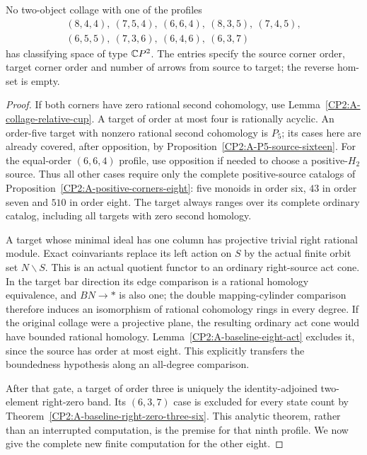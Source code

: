 \begin{proposition}
\label{CP2:A-triangular-sixteen-finite-profiles}
No two-object collage with one of the profiles
\[
\begin{gathered}
(8,4,4),\ (7,5,4),\ (6,6,4),\ (8,3,5),\ (7,4,5),\\
(6,5,5),\ (7,3,6),\ (6,4,6),\ (6,3,7)
\end{gathered}
\]
has classifying space of type $\mathbb{C}P^2$. The entries specify
the source corner order, target corner order and number of
arrows from source to target; the reverse hom-set is empty.
\end{proposition}
\begin{proof}
If both corners have zero rational second cohomology, use
Lemma~\ref{CP2:A-collage-relative-cup}. A target of order at
most four is rationally acyclic. An order-five target with
nonzero rational second cohomology is $P_5$; its cases here
are already covered, after opposition, by
Proposition~\ref{CP2:A-P5-source-sixteen}.
For the equal-order $(6,6,4)$ profile, use opposition if needed
to choose a positive-$H_2$ source. Thus all other cases require
only the complete positive-source catalogs of
Proposition~\ref{CP2:A-positive-corners-eight}: five monoids
in order six, $43$ in order seven and $510$ in order eight.
The target always ranges over its complete ordinary catalog,
including all targets with zero second homology.

A target whose minimal ideal has one column has projective
trivial right rational module. Exact coinvariants replace its
left action on $S$ by the actual finite orbit set $N\backslash S$.
This is an actual quotient functor to an ordinary right-source
act cone. In the target bar direction its edge comparison is
a rational homology equivalence, and $BN\to *$ is also one;
the double mapping-cylinder comparison therefore induces an
isomorphism of rational cohomology rings in every degree.
If the original collage were a projective plane, the resulting
ordinary act cone would have bounded rational homology.
Lemma~\ref{CP2:A-baseline-eight-act} excludes it, since the
source has order at most eight. This explicitly transfers the
boundedness hypothesis along an all-degree comparison.

After that gate, a target of order three is uniquely the
identity-adjoined two-element right-zero band. Its $(6,3,7)$
case is excluded for every state count by
Theorem~\ref{CP2:A-baseline-right-zero-three-six}.
This analytic theorem, rather than an interrupted computation,
is the premise for that ninth profile. We now give the complete
new finite computation for the other eight.


\end{proof}
